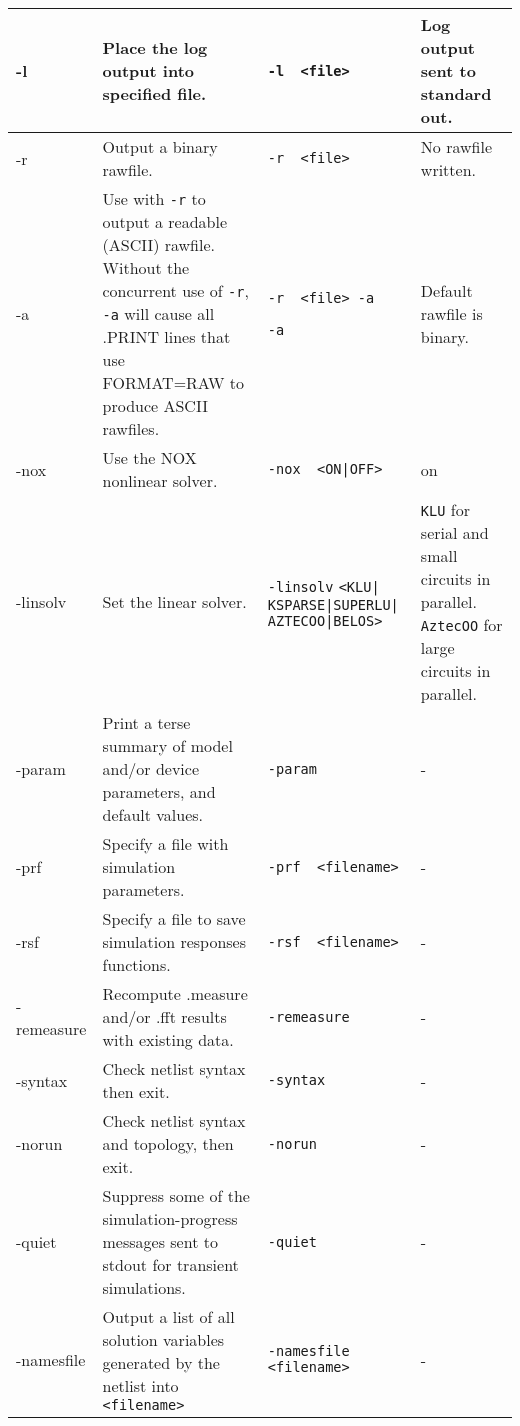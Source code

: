 \begin{longtable}[h] {>{\raggedright\small}m{1.1in}|>{\raggedright\small}m{2in}|>{\raggedright\small}m{1.5in}|>{\raggedright\let\\\tabularnewline\small}m{1in}}
-l &
Place the log output into specified file. &
\verb+-l  <file>+ &
Log output sent to standard out. \\ \hline

-r &
Output a binary rawfile. &
\verb+-r  <file>+ &
No rawfile written. \\ \hline

-a &
Use with \verb+-r+ to output a readable (ASCII) rawfile.
Without the concurrent use of \verb+-r+, \verb+-a+
will cause all .PRINT lines that use FORMAT=RAW to produce
ASCII rawfiles. &
\verb+-r  <file> -a+

\verb+-a+
&
Default rawfile is binary. \\ \hline

-nox &
Use the NOX nonlinear solver. &
\verb+-nox  <ON|OFF>+ &
on \\ \hline

-linsolv &
Set the linear solver. &
\verb+-linsolv+
\verb+<KLU|+
\verb+KSPARSE|SUPERLU|+
\verb+AZTECOO|BELOS>+ &
\texttt{KLU} for serial and small circuits in parallel. \texttt{AztecOO} for large circuits in parallel. \\ \hline

-param &
Print a terse summary of model and/or device parameters,
and default values. &
\verb+-param+ &
- \\ \hline

-prf &
Specify a file with simulation parameters. &
\verb+-prf  <filename>+ &
- \\ \hline

-rsf &
Specify a file to save simulation responses functions. &
\verb+-rsf  <filename>+ &
- \\ \hline

-remeasure &
Recompute .measure and/or .fft results with existing data. &
\verb+-remeasure+ &
- \\ \hline

-syntax &
Check netlist syntax then exit.&
\verb+-syntax+ &
- \\ \hline

-norun &
Check netlist syntax and topology, then exit. &
\verb+-norun+ &
- \\ \hline

-quiet &
Suppress some of the simulation-progress messages
sent to stdout for transient simulations. &
\verb+-quiet+ &
- \\ \hline

-namesfile &
Output a list of all solution variables generated by the netlist
into \texttt{<filename>} &
\verb+-namesfile+
\verb+<filename>+ &
- \\ \hline


\end{longtable}

